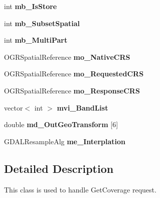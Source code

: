 \begin{DoxyCompactItemize}
\item 
\hypertarget{classWCS__GetCoverage_a2b325ed109ae7b9578a4ea92d1a85b01}{
int {\bfseries mb\_\-IsStore}}
\label{classWCS__GetCoverage_a2b325ed109ae7b9578a4ea92d1a85b01}

\item 
\hypertarget{classWCS__GetCoverage_a6ff57c181b18c4f56d14178d83f25d52}{
int {\bfseries mb\_\-SubsetSpatial}}
\label{classWCS__GetCoverage_a6ff57c181b18c4f56d14178d83f25d52}

\item 
\hypertarget{classWCS__GetCoverage_acadd942be00df0c80ad95f8eddec19ff}{
int {\bfseries mb\_\-MultiPart}}
\label{classWCS__GetCoverage_acadd942be00df0c80ad95f8eddec19ff}

\item 
\hypertarget{classWCS__GetCoverage_a5f1b0349f1e4977ae38110749590e709}{
OGRSpatialReference {\bfseries mo\_\-NativeCRS}}
\label{classWCS__GetCoverage_a5f1b0349f1e4977ae38110749590e709}

\item 
\hypertarget{classWCS__GetCoverage_adbe146d4c5abcbd811772e22e2712b9b}{
OGRSpatialReference {\bfseries mo\_\-RequestedCRS}}
\label{classWCS__GetCoverage_adbe146d4c5abcbd811772e22e2712b9b}

\item 
\hypertarget{classWCS__GetCoverage_aa2af672aaf0d65ef46d6edc067486170}{
OGRSpatialReference {\bfseries mo\_\-ResponseCRS}}
\label{classWCS__GetCoverage_aa2af672aaf0d65ef46d6edc067486170}

\item 
\hypertarget{classWCS__GetCoverage_aff40bdde8e489d0647d07d0c1342dcae}{
vector$<$ int $>$ {\bfseries mvi\_\-BandList}}
\label{classWCS__GetCoverage_aff40bdde8e489d0647d07d0c1342dcae}

\item 
\hypertarget{classWCS__GetCoverage_aa7873d69344c6495a7a72655c753e48f}{
double {\bfseries md\_\-OutGeoTransform} \mbox{[}6\mbox{]}}
\label{classWCS__GetCoverage_aa7873d69344c6495a7a72655c753e48f}

\item 
\hypertarget{classWCS__GetCoverage_a28b6f3ae72b3a62e0841375395200518}{
GDALResampleAlg {\bfseries me\_\-Interplation}}
\label{classWCS__GetCoverage_a28b6f3ae72b3a62e0841375395200518}

\end{DoxyCompactItemize}


\subsection{Detailed Description}
This class is used to handle GetCoverage request. 

